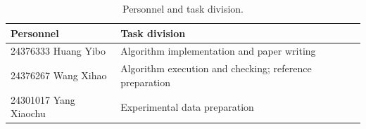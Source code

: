 \documentclass[11pt,a4paper]{article}
\begin{document}
\begin{table}[H]
\centering
\caption{Personnel and task division.}
\label{tab:personnel}
\begin{tabular}{ll}
\toprule
Personnel & Task division \\
\midrule
24376333 Huang Yibo & Algorithm implementation and paper writing \\
24376267 Wang Xihao & Algorithm execution and checking; reference preparation \\
24301017 Yang Xiaochu & Experimental data preparation \\
\bottomrule
\end{tabular}
\end{table}

\renewcommand{\refname}{8 References}


\end{document}

